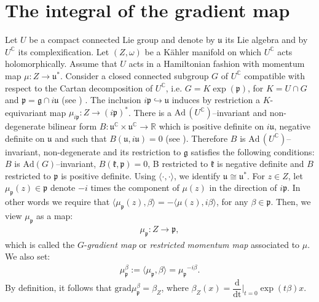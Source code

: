 \documentclass[leqno,11pt, a4]{amsart}
\theoremstyle{named}
\begin{document}
\section{The integral of the gradient map}\label{gradient-map}
Let $U$ be a compact connected Lie group and {denote by ${\mathfrak{u}}$ its Lie algebra and by} $U^{\mathbb{C}}$ its
complexification.  Let $(Z,\omega)$ be a K\"ahler manifold on which
$U^{\mathbb{C}}$ acts holomorphically. Assume that $U$ acts in a Hamiltonian
fashion with momentum map $\mu:Z {\longrightarrow}{\mathfrak{u}}^*$.  Consider a closed connected subgroup $G$
of $U^{\mathbb{C}}$ compatible with respect
to the Cartan decomposition of $U^{\mathbb{C}}${, i.e. $G=K\exp ({\mathfrak{p}})$, for $K=U\cap
G$ and ${\mathfrak{p}}={\mathfrak{g}} \cap i{\mathfrak{u}}$
(see \cite{heinzner-schwarz-stoetzel,heinzner-stoetzel-global})}
\cite{heinzner-schwarz-stoetzel,heinzner-stoetzel-global}.  The
inclusion $i {\mathfrak{p}} \hookrightarrow {\mathfrak{u}}$ induces by restriction a
$K$-equivariant map $\mu_{i {\mathfrak{p}}}:Z {\longrightarrow} (i {\mathfrak{p}})^*$.
There is a
$\mathrm{Ad}\, (U^{\mathbb{C}})$--invariant and non-degenerate bilinear {form} $B:{\mathfrak{u}}^{\mathbb{C}} \times {\mathfrak{u}}^{\mathbb{C}} {\longrightarrow} {\mathbb{R}}$ which is
positive definite on $i{\mathfrak{u}}$, negative definite on ${\mathfrak{u}}$ and such
that $B({\mathfrak{u}},i{\mathfrak{u}})=0$ (see \cite[p. 585]{biliotti-ghigi-heinzner-2}). 
Therefore $B$ is
$\mathrm{Ad}\, (U^{\mathbb{C}})$--invariant, non-degenerate and its restriction
to ${\mathfrak{g}}$ satisfies the following conditions: $B$ is $\mathrm{Ad}(G)$--invariant, $B({\mathfrak{k}},{\mathfrak{p}})=0$, B restricted to ${\mathfrak{k}}$ is negative definite and $B$ restricted to ${\mathfrak{p}}$ is positive definite. Using ${{\langle} \cdot , \cdot {\rangle}}$, we identify ${\mathfrak{u}}
\cong {\mathfrak{u}}^*$.   For $z \in Z$, let ${\mu_{\mathfrak{p}}} (z) \in {\mathfrak{p}}$ denote $-i$ times the
component of $\mu(z)$ in the direction of $i{\mathfrak{p}}$.  In other words we
require that ${\langle} {\mu_{\mathfrak{p}}} (z) , \beta {\rangle} = - {\langle} \mu(z) , i\beta{\rangle}$,
for any $\beta \in {\mathfrak{p}}$. Then, we view $\mu_{\mathfrak{p}}$ as a map:
\begin{gather*}
  \mu_{\mathfrak{p}} : Z {\rightarrow} {\mathfrak{p}} ,
\end{gather*}
which is called the $G$-\emph{gradient map} or \emph{restricted
  momentum map} associated to $\mu$.  We also set:
\begin{gather*}
  {\mu_{\mathfrak{p}}^\beta}:= {\langle} {\mu_{\mathfrak{p}}}, \beta {\rangle} = {\mu_{\mathfrak{p}}}^{-i\beta}.
\end{gather*}
By definition, it follows that $\mathrm{grad}{\mu_{\mathfrak{p}}^\beta} =\beta_Z$, where $\beta_Z (x)={{\dfrac {\mathrm {d}  }{\mathrm {dt}}} \vert _{t=0} } \exp(t\beta) x$.
\end{document}
